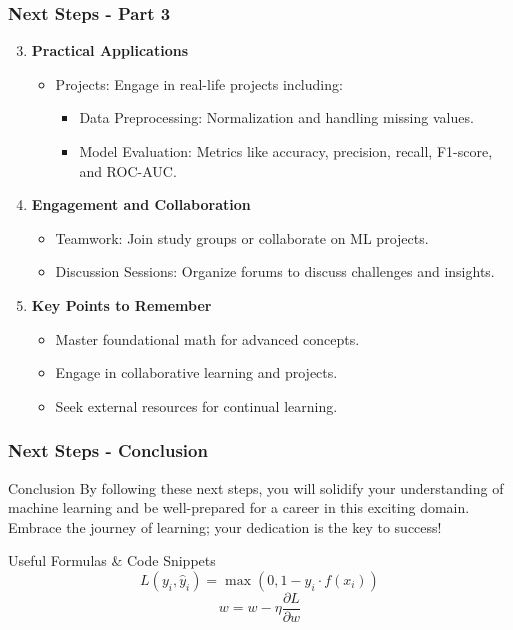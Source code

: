 \documentclass[aspectratio=169]{beamer}
\begin{document}
\begin{frame}[fragile]
    \frametitle{Next Steps - Part 3}
    \begin{enumerate}
        \setcounter{enumi}{2}
        \item \textbf{Practical Applications}
            \begin{itemize}
                \item Projects: Engage in real-life projects including:
                \begin{itemize}
                    \item Data Preprocessing: Normalization and handling missing values.
                    \item Model Evaluation: Metrics like accuracy, precision, recall, F1-score, and ROC-AUC.
                \end{itemize}
            \end{itemize}
        \item \textbf{Engagement and Collaboration}
            \begin{itemize}
                \item Teamwork: Join study groups or collaborate on ML projects.
                \item Discussion Sessions: Organize forums to discuss challenges and insights.
            \end{itemize}
        \item \textbf{Key Points to Remember}
            \begin{itemize}
                \item Master foundational math for advanced concepts.
                \item Engage in collaborative learning and projects.
                \item Seek external resources for continual learning.
            \end{itemize}
    \end{enumerate}
\end{frame}

\begin{frame}[fragile]
    \frametitle{Next Steps - Conclusion}
    \begin{block}{Conclusion}
        By following these next steps, you will solidify your understanding of machine learning and be well-prepared for a career in this exciting domain. Embrace the journey of learning; your dedication is the key to success!
    \end{block}
    
    \begin{block}{Useful Formulas & Code Snippets}
        \begin{equation}
            L(y_i, \hat{y}_i) = \max(0, 1 - y_i \cdot f(x_i))
        \end{equation}
        \begin{equation}
            w = w - \eta \frac{\partial L}{\partial w}
        \end{equation}
    \end{block}
\end{frame}
\end{document}
